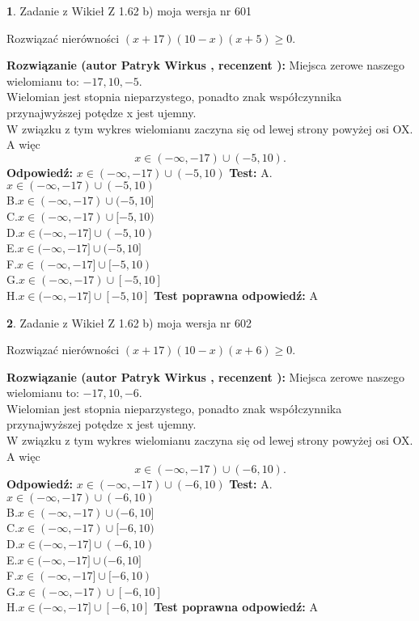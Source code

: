 \documentclass[12pt, a4paper]{article}
\theoremstyle{definition} %
\newtheorem{zad}{}
\newcommand{\zadStart}[1]{\begin{zad}#1\newline}
\newcommand{\zadStop}{\end{zad}}
\newcommand{\rozwStart}[2]{\noindent \textbf{Rozwiązanie (autor #1 , recenzent #2): }\newline}
\newcommand{\rozwStop}{\newline}
\newcommand{\odpStart}{\noindent \textbf{Odpowiedź:}\newline}
\newcommand{\odpStop}{\newline}
\newcommand{\testStart}{\noindent \textbf{Test:}\newline}
\newcommand{\testStop}{\newline}
\newcommand{\kluczStart}{\noindent \textbf{Test poprawna odpowiedź:}\newline}
\newcommand{\kluczStop}{\newline}
\begin{document}
\zadStart{Zadanie z Wikieł Z 1.62 b) moja wersja nr 601}

Rozwiązać nierówności $(x+17)(10-x)(x+5)\ge0$.
\zadStop
\rozwStart{Patryk Wirkus}{}
Miejsca zerowe naszego wielomianu to: $-17, 10, -5$.\\
Wielomian jest stopnia nieparzystego, ponadto znak współczynnika przy\linebreak najwyższej potędze x jest ujemny.\\ W związku z tym wykres wielomianu zaczyna się od lewej strony powyżej osi OX. A więc $$x \in (-\infty,-17) \cup (-5,10).$$
\rozwStop
\odpStart
$x \in (-\infty,-17) \cup (-5,10)$
\odpStop
\testStart
A.$x \in (-\infty,-17) \cup (-5,10)$\\
B.$x \in (-\infty,-17) \cup (-5,10]$\\
C.$x \in (-\infty,-17) \cup [-5,10)$\\
D.$x \in (-\infty,-17] \cup (-5,10)$\\
E.$x \in (-\infty,-17] \cup (-5,10]$\\
F.$x \in (-\infty,-17] \cup [-5,10)$\\
G.$x \in (-\infty,-17) \cup [-5,10]$\\
H.$x \in (-\infty,-17] \cup [-5,10]$
\testStop
\kluczStart
A
\kluczStop



\zadStart{Zadanie z Wikieł Z 1.62 b) moja wersja nr 602}

Rozwiązać nierówności $(x+17)(10-x)(x+6)\ge0$.
\zadStop
\rozwStart{Patryk Wirkus}{}
Miejsca zerowe naszego wielomianu to: $-17, 10, -6$.\\
Wielomian jest stopnia nieparzystego, ponadto znak współczynnika przy\linebreak najwyższej potędze x jest ujemny.\\ W związku z tym wykres wielomianu zaczyna się od lewej strony powyżej osi OX. A więc $$x \in (-\infty,-17) \cup (-6,10).$$
\rozwStop
\odpStart
$x \in (-\infty,-17) \cup (-6,10)$
\odpStop
\testStart
A.$x \in (-\infty,-17) \cup (-6,10)$\\
B.$x \in (-\infty,-17) \cup (-6,10]$\\
C.$x \in (-\infty,-17) \cup [-6,10)$\\
D.$x \in (-\infty,-17] \cup (-6,10)$\\
E.$x \in (-\infty,-17] \cup (-6,10]$\\
F.$x \in (-\infty,-17] \cup [-6,10)$\\
G.$x \in (-\infty,-17) \cup [-6,10]$\\
H.$x \in (-\infty,-17] \cup [-6,10]$
\testStop
\kluczStart
A
\kluczStop
\end{document}

